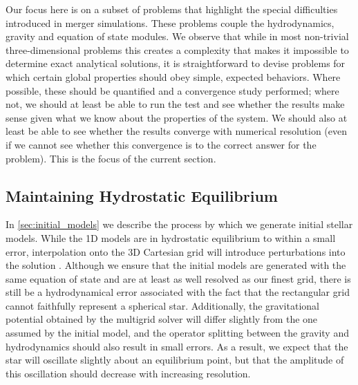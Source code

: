 \documentclass[12pt]{article}
\begin{document}
Our focus here is on a subset of problems that highlight the special difficulties
introduced in merger simulations. These problems couple the hydrodynamics, gravity and
equation of state modules. We observe that while in most non-trivial
three-dimensional problems this creates a complexity that makes it
impossible to determine exact analytical solutions, it is
straightforward to devise problems for which certain global properties
should obey simple, expected behaviors. Where possible, these should
be quantified and a convergence study performed; where not, we should at least
be able to run the test and see whether the results make sense given what
we know about the properties of the system. We should also at least be able
to see whether the results converge with numerical resolution (even if we cannot
see whether this convergence is to the correct answer for the problem).
This is the focus of the current section.

\subsection{Maintaining Hydrostatic Equilibrium}
\label{sec:HSE}

In \autoref{sec:initial_models} we describe the process by which
we generate initial stellar models. While the 1D models are in
hydrostatic equilibrium to within a small error, interpolation onto
the 3D Cartesian grid will introduce perturbations into the solution
\citep{zingale:2002}. Although we ensure that the initial models are
generated with the same equation of state and are at least as well resolved as
our finest grid, there is still be a hydrodynamical error associated
with the fact that the rectangular grid cannot faithfully represent a
spherical star. Additionally, the gravitational potential obtained by
the multigrid solver will differ slightly from the one assumed by the
initial model, and the operator splitting between the gravity and
hydrodynamics should also result in small errors. As a result, we
expect that the star will oscillate slightly about an equilibrium
point, but that the amplitude of this oscillation should decrease with
increasing resolution.
\end{document}
